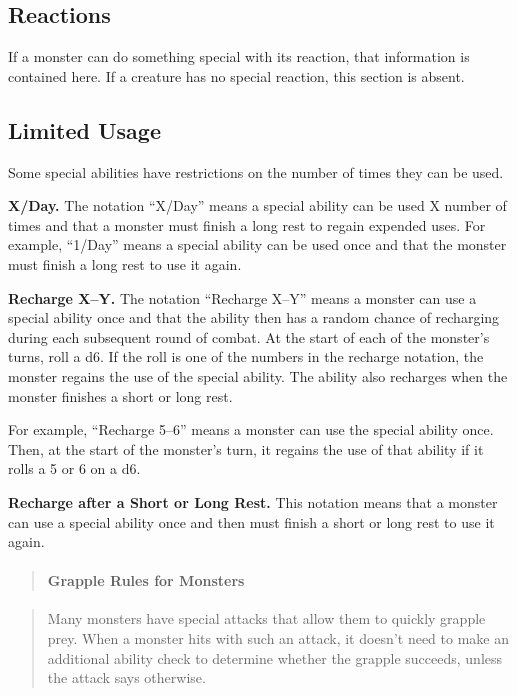 \documentclass[
]{article}
\begin{document}
\hypertarget{reactions}{%
\subsection{Reactions}\label{reactions}}

If a monster can do something special with its reaction, that
information is contained here. If a creature has no special reaction,
this section is absent.

\hypertarget{limited-usage}{%
\subsection{Limited Usage}\label{limited-usage}}

Some special abilities have restrictions on the number of times they can
be used.

\textbf{X/Day.} The notation ``X/Day'' means a special ability can be
used X number of times and that a monster must finish a long rest to
regain expended uses. For example, ``1/Day'' means a special ability can
be used once and that the monster must finish a long rest to use it
again.

\textbf{Recharge X--Y.} The notation ``Recharge X--Y'' means a monster
can use a special ability once and that the ability then has a random
chance of recharging during each subsequent round of combat. At the
start of each of the monster's turns, roll a d6. If the roll is one of
the numbers in the recharge notation, the monster regains the use of the
special ability. The ability also recharges when the monster finishes a
short or long rest.

For example, ``Recharge 5--6'' means a monster can use the special
ability once. Then, at the start of the monster's turn, it regains the
use of that ability if it rolls a 5 or 6 on a d6.

\textbf{Recharge after a Short or Long Rest.} This notation means that a
monster can use a special ability once and then must finish a short or
long rest to use it again.

\begin{quote}
\mbox{}%
\hypertarget{grapple-rules-for-monsters}{%
\paragraph{Grapple Rules for
Monsters}\label{grapple-rules-for-monsters}}
\end{quote}

\begin{quote}
Many monsters have special attacks that allow them to quickly grapple
prey. When a monster hits with such an attack, it doesn't need to make
an additional ability check to determine whether the grapple succeeds,
unless the attack says otherwise.
\end{quote}
\end{document}
